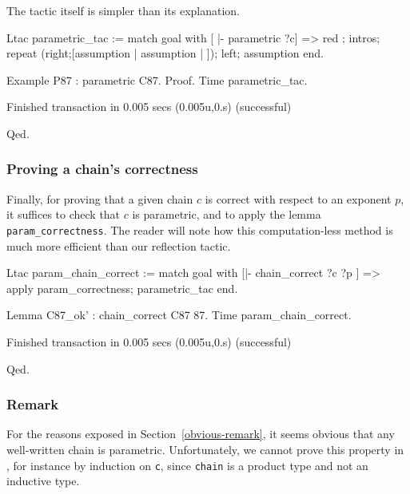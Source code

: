 The tactic itself is simpler than its explanation. 

\begin{Coqsrc}
Ltac parametric_tac  := 
match goal with [ |- parametric ?c] =>
   red ; intros;
   repeat (right;[assumption | assumption | ]);  
   left; assumption
end.

Example P87 : parametric C87.
Proof. Time parametric_tac. 
\end{Coqsrc}

\begin{Coqanswer}
Finished transaction in 0.005 secs (0.005u,0.s) (successful)
\end{Coqanswer}

\begin{Coqsrc}
Qed. 
\end{Coqsrc}



\subsubsection{Proving a chain's correctness}
\label{C87-param-ok}
Finally, for proving that a given chain $c$ is correct with respect to an exponent $p$, it suffices to check that $c$ is parametric, and
to apply the lemma \texttt{param\_correctness}. 
The reader will note how this computation-less method is much more efficient
than our reflection tactic.

\begin{Coqsrc}
Ltac param_chain_correct :=
match goal with 
[|- chain_correct ?c ?p ] => 
apply param_correctness; parametric_tac
end.

Lemma C87_ok' : chain_correct C87 87.
Time param_chain_correct.
\end{Coqsrc}

\begin{Coqanswer}
Finished transaction in 0.005 secs (0.005u,0.s) (successful)
\end{Coqanswer}

\begin{Coqsrc}
Qed.
\end{Coqsrc}

\subsubsection{Remark}
For the reasons exposed in Section~\vref{obvious-remark}, 
it seems obvious that any well-written chain is parametric.
Unfortunately, we cannot prove this property  in \coq{},
for instance by induction on \texttt{c}, 
since \texttt{chain} is a product type and not an inductive type.

